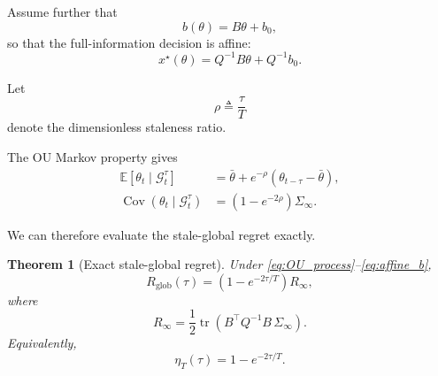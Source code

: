 \documentclass[11pt]{article}
\newtheorem{theorem}{Theorem}
\begin{document}
Assume further that
\begin{equation}
    b(\theta)=B\theta+b_0,
    \label{eq:affine_b}
\end{equation}
so that the full-information decision is affine:
\begin{equation}
    x^\star(\theta)
    =
    Q^{-1}B\theta+Q^{-1}b_0.
    \label{eq:affine_xstar}
\end{equation}

Let
\begin{equation}
    \rho
    \triangleq
    \frac{\tau}{T}
    \label{eq:rho_definition}
\end{equation}
denote the dimensionless staleness ratio.

The OU Markov property gives
\cite[eqs.~(8)--(10), (14)]{ornee2021ou}
\begin{align}
    \mathbb{E}
    \left[
        \theta_t
        \mid
        \mathcal{G}^{\tau}_t
    \right]
    &=
    \bar{\theta}
    +
    e^{-\rho}
    \left(
        \theta_{t-\tau}-\bar{\theta}
    \right),
    \label{eq:OU_condmean}
    \\
    \operatorname{Cov}
    \left(
        \theta_t
        \mid
        \mathcal{G}^{\tau}_t
    \right)
    &=
    \left(
        1-e^{-2\rho}
    \right)
    \Sigma_\infty.
    \label{eq:OU_condcov}
\end{align}

We can therefore evaluate the stale-global regret exactly.

\begin{theorem}[Exact stale-global regret]
\label{thm:OU_stale_regret}
Under \eqref{eq:OU_process}--\eqref{eq:affine_b},
\begin{equation}
    \boxed{
    R_{\mathrm{glob}}(\tau)
    =
    \left(
        1-e^{-2\tau/T}
    \right)R_\infty,
    }
    \label{eq:OU_exact_regret}
\end{equation}
where
\begin{equation}
    R_\infty
    =
    \frac{1}{2}
    \operatorname{tr}
    \left(
        B^\top Q^{-1}B\,
        \Sigma_\infty
    \right).
    \label{eq:OU_Rinf}
\end{equation}
Equivalently,
\begin{equation}
    \boxed{
    \eta_T(\tau)
    =
    1-e^{-2\tau/T}.
    }
    \label{eq:OU_etaT}
\end{equation}
\end{theorem}
\end{document}
